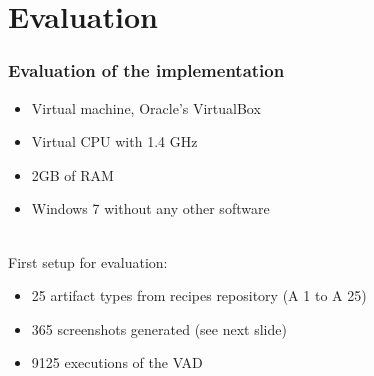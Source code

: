 \documentclass[xcolor=dvipsnames]{beamer}
\begin{document}
	\section{Evaluation}
	\begin{frame}
		\frametitle{Evaluation of the implementation}
		\begin{itemize}
			\item Virtual machine, Oracle's VirtualBox \cite{virtualbox}
			\item Virtual CPU with 1.4 GHz
			\item 2GB of RAM
			\item Windows 7 without any other software
		\end{itemize}
		\vspace*{1cm}~\\
		\pause
		First setup for evaluation:
		\begin{itemize}
			\item 25 artifact types from recipes repository (A 1 to A 25)
			\item 365 screenshots generated (see next slide)
			\item 9125 executions of the VAD
		\end{itemize}
	\end{frame}
	
\end{document}
